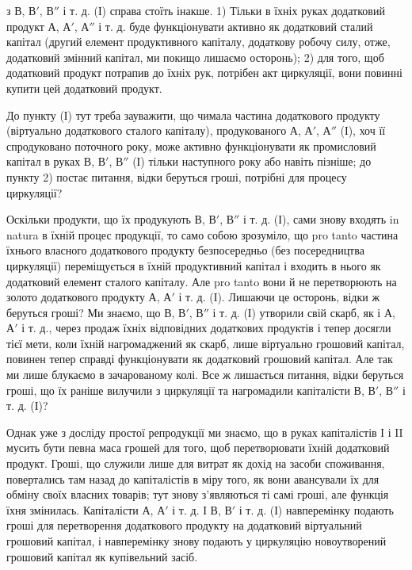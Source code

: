 \parcont{}  %
з $В$, $В'$, $В''$ і т. д. (І) справа стоїть інакше. 1) Тільки в їхніх руках
додатковий продукт $А$, $А'$, $А''$ і т. д. буде функціонувати активно як
додатковий сталий капітал (другий елемент продуктивного капіталу, додаткову
робочу силу, отже, додатковий змінний капітал, ми покищо
лишаємо осторонь); 2) для того, щоб додатковий продукт потрапив до
їхніх рук, потрібен акт циркуляції, вони повинні купити цей додатковий
продукт.

До пункту (І) тут треба зауважити, що чимала частина додаткового
продукту (віртуально додаткового сталого капіталу), продукованого
$А$, $А'$, $А''$ (І), хоч її спродуковано поточного року, може активно функціонувати
як промисловий капітал в руках $В$, $В'$, $В''$ (І) тільки наступного
року або навіть пізніше; до пункту 2) постає питання, відки беруться
гроші, потрібні для процесу циркуляції?

Оскільки продукти, що їх продукують $В$, $В'$, $В''$ і т. д. (І), сами
знову входять in natura в їхній процес продукції, то само собою зрозуміло,
що pro tanto частина їхнього власного додаткового продукту безпосередньо
(без посередництва циркуляції) переміщується в їхній продуктивний
капітал і входить в нього як додатковий елемент сталого капіталу.
Але pro tanto вони й не перетворюють на золото додаткового
продукту $А$, $А'$ і т. д. (І). Лишаючи це осторонь, відки ж беруться
гроші? Ми знаємо, що $В$, $В'$, $В''$ і т. д. (І) утворили свій скарб, як і
$А$, $А'$ і т. д., через продаж їхніх відповідних додаткових продуктів і
тепер досягли тієї мети, коли їхній нагромаджений як скарб, лише віртуально
грошовий капітал, повинен тепер справді функціонувати як
додатковий грошовий капітал. Але так ми лише блукаємо в зачарованому
колі. Все ж лишається питання, відки беруться гроші, що їх раніше
вилучили з циркуляції та нагромадили капіталісти $В$, $В'$, $В''$ і т. д. (І)?

Однак уже з досліду простої репродукції ми знаємо, що в руках
капіталістів І і II мусить бути певна маса грошей для того, щоб перетворювати
їхній додатковий продукт. Гроші, що служили лише для витрат
як дохід на засоби споживання, повертались там назад до капіталістів
в міру того, як вони авансували їх для обміну своїх власних товарів;
тут знову з’являються ті самі гроші, але функція їхня змінилась.
Капіталісти $А$, $А'$ і т. д. І $В$, $В'$ і т. д. (І) навперемінку подають гроші
для перетворення додаткового продукту на додатковий віртуальний грошовий
капітал, і навперемінку знову подають у циркуляцію новоутворений
грошовий капітал як купівельний засіб.

